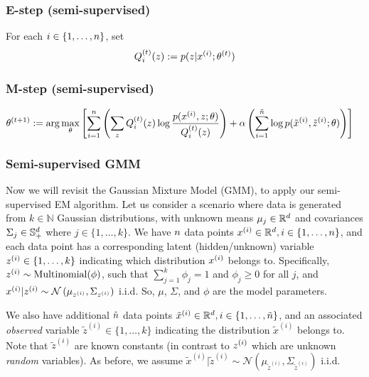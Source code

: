 \subsubsection*{E-step (semi-supervised)}

For each $i \in \{1,\ldots,{n}\}$, set
\begin{align*}
    Q_i^{(t)}(z) := p(z|x^{(i)};\theta^{(t)})
\end{align*}

\subsubsection*{M-step (semi-supervised)}

\begin{align*}
    \theta^{(t+1)} &:= \arg\max_\theta\left[ \sum_{i=1}^{n}\left( \sum_{z} Q^{(t)}_i(z) \log \frac{ p(x^{(i)}, z;\theta) }{ Q^{(t)}_i(z)}\right)  + \alpha \left(\sum_{i=1}^{\tilde{{n}}} \log p(\tilde{x}^{(i)},\tilde{z}^{(i)};\theta)\right)\right]
\end{align*}

\begin{enumerate}
  
\ifnum{} {
  
} \fi

\end{enumerate}


\subsubsection*{Semi-supervised GMM}
Now we will revisit the Gaussian Mixture Model (GMM), to apply our semi-supervised EM algorithm. Let us consider a scenario where data is generated from $k \in \mathbb{N}$ Gaussian distributions, with unknown means $\mu_j \in \mathbb{R}^{d}$ and covariances $\Sigma_j \in \mathbb{S}_+^{d}$ where $j \in \{1,\ldots,k\}$. We have ${n}$ data points $x^{(i)} \in \mathbb{R}^{d}, i \in \{1,\ldots,{n}\}$, and each data point has a corresponding latent (hidden/unknown) variable $z^{(i)} \in \{1,\ldots,k\}$ indicating which distribution $x^{(i)}$ belongs to. Specifically, $z^{(i)} \sim \text{Multinomial}(\phi)$, such that $\sum_{j=1}^k\phi_j = 1$ and $\phi_j \ge 0$ for all $j$, and $x^{(i)}|z^{(i)} \sim \mathcal{N}\left(\mu_{z^{(i)}}, \Sigma_{z^{(i)}}\right)$ i.i.d. So, $\mu$, $\Sigma$, and $\phi$ are the model parameters.

We also have additional $\tilde{{n}}$ data points $\tilde{x}^{(i)} \in \mathbb{R}^{d}, i \in \{1,\ldots,\tilde{{n}}\}$, and an associated \emph{observed} variable $\tilde{z}^{(i)} \in \{1,\ldots,k\}$ indicating the distribution $\tilde{x}^{(i)}$ belongs to. Note that $\tilde{z}^{(i)}$ are known constants (in contrast to $z^{(i)}$ which are unknown \emph{random} variables). As before, we assume $\tilde{x}^{(i)}|\tilde{z}^{(i)} \sim \mathcal{N}\left(\mu_{\tilde{z}^{(i)}}, \Sigma_{\tilde{z}^{(i)}}\right)$ i.i.d.



